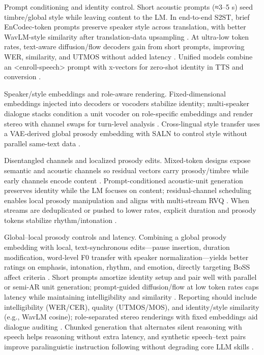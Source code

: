 \documentclass{article}
\begin{document}
Prompt conditioning and identity control. Short acoustic prompts (≈3–5 s) seed timbre/global style while leaving content to the LM. In end-to-end S2ST, brief EnCodec-token prompts preserve speaker style across translation, with better WavLM-style similarity after translation-data upsampling \cite{peng2024mslms2stmultitaskspeechlanguagemodeltext}. At ultra-low token rates, text-aware diffusion/flow decoders gain from short prompts, improving WER, similarity, and UTMOS without added latency \cite{wang2025tadicodectextawarediffusionspeechtokeniz}. Unified models combine an <enroll-speech> prompt with x-vectors for zero-shot identity in TTS and conversion \cite{wu2024speechcomposerunifyingmultiplespeechtask}.

Speaker/style embeddings and role-aware rendering. Fixed-dimensional embeddings injected into decoders or vocoders stabilize identity; multi-speaker dialogue stacks condition a unit vocoder on role-specific embeddings and render stereo with channel swaps for turn-level analysis \cite{nakata2024jchatjapaneselargescalespokendialoguecor}. Cross-lingual style transfer uses a VAE-derived global prosody embedding with SALN to control style without parallel same-text data \cite{huang2023holisticcascadesystembenchmarkhumanevalu}.

Disentangled channels and localized prosody edits. Mixed-token designs expose semantic and acoustic channels so residual vectors carry prosody/timbre while early channels encode content \cite{wang2025bossbeyondsemanticspeech}. Prompt-conditioned acoustic-unit generation preserves identity while the LM focuses on content; residual-channel scheduling enables local prosody manipulation and aligns with multi-stream RVQ \cite{peng2024mslms2stmultitaskspeechlanguagemodeltext}. When streams are deduplicated or pushed to lower rates, explicit duration and prosody tokens stabilize rhythm/intonation \cite{huang2023holisticcascadesystembenchmarkhumanevalu}.

Global–local prosody controls and latency. Combining a global prosody embedding with local, text-synchronous edits—pause insertion, duration modification, word-level F0 transfer with speaker normalization—yields better ratings on emphasis, intonation, rhythm, and emotion, directly targeting BoSS affect criteria \cite{huang2023holisticcascadesystembenchmarkhumanevalu,wang2025bossbeyondsemanticspeech}. Short prompts amortize identity setup and pair well with parallel or semi-AR unit generation; prompt-guided diffusion/flow at low token rates caps latency while maintaining intelligibility and similarity \cite{wang2025tadicodectextawarediffusionspeechtokeniz}. Reporting should include intelligibility (WER/CER), quality (UTMOS/MOS), and identity/style similarity (e.g., WavLM cosine); role-separated stereo renderings with fixed embeddings aid dialogue auditing \cite{nakata2024jchatjapaneselargescalespokendialoguecor}. Chunked generation that alternates silent reasoning with speech helps reasoning without extra latency, and synthetic speech–text pairs improve paralinguistic instruction following without degrading core LLM skills \cite{chiang2025stitchsimultaneousthinkingtalkingchunked,lu2025desta2developinginstructionfollowingspee}.
\end{document}

